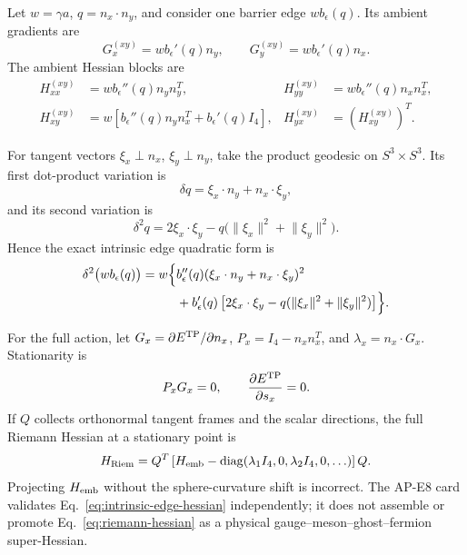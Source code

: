 \documentclass[11pt]{article}
\numberwithin{equation}{section}
\theoremstyle{definition}
\theoremstyle{remark}
\newcommand{\diag}{\operatorname{diag}}
\begin{document}
Let \(w=\gamma a\), \(q=n_x\cdot n_y\), and consider one barrier edge
\(w b_\epsilon(q)\).  Its ambient gradients are
\begin{equation}
 G_x^{(xy)}=w b_\epsilon'(q)n_y,\qquad
 G_y^{(xy)}=w b_\epsilon'(q)n_x.
 \label{eq:edge-gradient}
\end{equation}
The ambient Hessian blocks are
\begin{align}
 H_{xx}^{(xy)}&=w b_\epsilon''(q)n_yn_y^T,&
 H_{yy}^{(xy)}&=w b_\epsilon''(q)n_xn_x^T,\nonumber\\
 H_{xy}^{(xy)}&=w\left[b_\epsilon''(q)n_yn_x^T
 +b_\epsilon'(q)I_4\right],&
 H_{yx}^{(xy)}&=(H_{xy}^{(xy)})^T.
 \label{eq:edge-ambient-hessian}
\end{align}

For tangent vectors \(\xi_x\perp n_x\), \(\xi_y\perp n_y\), take the
product geodesic on \(S^3\times S^3\).  Its first dot-product variation is
\begin{equation}
 \delta q=\xi_x\cdot n_y+n_x\cdot\xi_y,
 \label{eq:delta-q}
\end{equation}
and its second variation is
\begin{equation}
 \delta^2q=2\xi_x\cdot\xi_y
 -q\bigl(\lVert\xi_x\rVert^2+\lVert\xi_y\rVert^2\bigr).
 \label{eq:delta2-q}
\end{equation}
Hence the exact intrinsic edge quadratic form is
\begin{align}
 \delta^2\bigl(wb_\epsilon(q)\bigr)
 =w\Bigl\{&b_\epsilon''(q)
 (\xi_x\cdot n_y+n_x\cdot\xi_y)^2\nonumber\\
 &+b_\epsilon'(q)
 \left[2\xi_x\cdot\xi_y
 -q(\lVert\xi_x\rVert^2+\lVert\xi_y\rVert^2)\right]\Bigr\}.
 \label{eq:intrinsic-edge-hessian}
\end{align}

For the full action, let \(G_x=\partial E^{\rm TP}/\partial n_x\),
\(P_x=I_4-n_xn_x^T\), and \(\lambda_x=n_x\cdot G_x\).  Stationarity is
\begin{equation}
 P_xG_x=0,\qquad \frac{\partial E^{\rm TP}}{\partial s_x}=0.
 \label{eq:stationarity}
\end{equation}
If \(Q\) collects orthonormal tangent frames and the scalar directions, the
full Riemann Hessian at a stationary point is
\begin{equation}
 H_{\rm Riem}
 =Q^T\left[H_{\rm emb}
 -\diag(\lambda_1I_4,0,\lambda_2I_4,0,\ldots)\right]Q.
 \label{eq:riemann-hessian}
\end{equation}
Projecting \(H_{\rm emb}\) without the sphere-curvature shift is incorrect.
The AP-E8 card validates Eq.~\eqref{eq:intrinsic-edge-hessian} independently;
it does not assemble or promote Eq.~\eqref{eq:riemann-hessian} as a physical
gauge--meson--ghost--fermion super-Hessian.
\end{document}
